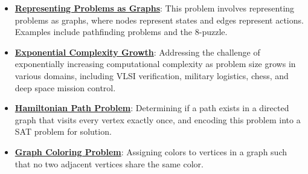 \documentclass{article}%
\begin{document}
\begin{itemize}[leftmargin=*]
\item \href{https://purdue.brightspace.com/d2l/common/assets/pdfjs-d2l-dist/1.0.14-legacy/web/viewer.html?file=\%2Fcontent\%2Fenforced\%2F1095467-wl.202510.CS.24300.001\%2F14L1-DepthFS.pdf\%3Fou\%3D1095467\&lang=en-us\&container=d2l-fileviewer-rendered-pdf\&fullscreen=d2l-fileviewer-rendered-pdf-dialog\&height=667#page=25}{\textbf{Representing Problems as Graphs}}: This problem involves representing problems as graphs, where nodes represent states and edges represent actions. Examples include pathfinding problems and the 8-puzzle.%
\item \href{https://purdue.brightspace.com/d2l/common/assets/pdfjs-d2l-dist/1.0.14-legacy/web/viewer.html?file=\%2Fcontent\%2Fenforced\%2F1095467-wl.202510.CS.24300.001\%2F15L2-SAT.pdf\%3Fou\%3D1095467\&lang=en-us\&container=d2l-fileviewer-rendered-pdf\&fullscreen=d2l-fileviewer-rendered-pdf-dialog\&height=667#page=4}{\textbf{Exponential Complexity Growth}}: Addressing the challenge of exponentially increasing computational complexity as problem size grows in various domains, including VLSI verification, military logistics, chess, and deep space mission control.%
\item \href{https://purdue.brightspace.com/d2l/common/assets/pdfjs-d2l-dist/1.0.14-legacy/web/viewer.html?file=\%2Fcontent\%2Fenforced\%2F1095467-wl.202510.CS.24300.001\%2F15L2-SAT.pdf\%3Fou\%3D1095467\&lang=en-us\&container=d2l-fileviewer-rendered-pdf\&fullscreen=d2l-fileviewer-rendered-pdf-dialog\&height=667#page=40}{\textbf{Hamiltonian Path Problem}}: Determining if a path exists in a directed graph that visits every vertex exactly once, and encoding this problem into a SAT problem for solution.%
\item \href{https://purdue.brightspace.com/d2l/common/assets/pdfjs-d2l-dist/1.0.14-legacy/web/viewer.html?file=\%2Fcontent\%2Fenforced\%2F1095467-wl.202510.CS.24300.001\%2F15L2-SAT.pdf\%3Fou\%3D1095467\&lang=en-us\&container=d2l-fileviewer-rendered-pdf\&fullscreen=d2l-fileviewer-rendered-pdf-dialog\&height=667#page=47}{\textbf{Graph Coloring Problem}}: Assigning colors to vertices in a graph such that no two adjacent vertices share the same color.%
\end{itemize}

%
\end{document}
